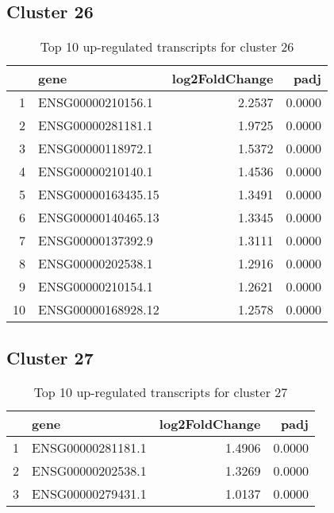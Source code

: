 \documentclass{article}
\begin{document}
\subsection{Cluster 26 }
\begin{table}[H]
\centering
\begin{tabular}{rlrr}
  \hline
 & gene & log2FoldChange & padj \\ 
  \hline
1 & ENSG00000210156.1 & 2.2537 & 0.0000 \\ 
  2 & ENSG00000281181.1 & 1.9725 & 0.0000 \\ 
  3 & ENSG00000118972.1 & 1.5372 & 0.0000 \\ 
  4 & ENSG00000210140.1 & 1.4536 & 0.0000 \\ 
  5 & ENSG00000163435.15 & 1.3491 & 0.0000 \\ 
  6 & ENSG00000140465.13 & 1.3345 & 0.0000 \\ 
  7 & ENSG00000137392.9 & 1.3111 & 0.0000 \\ 
  8 & ENSG00000202538.1 & 1.2916 & 0.0000 \\ 
  9 & ENSG00000210154.1 & 1.2621 & 0.0000 \\ 
  10 & ENSG00000168928.12 & 1.2578 & 0.0000 \\ 
   \hline
\end{tabular}
\caption{Top 10 up-regulated transcripts for cluster 26} 
\label{tab:q3_1_26}
\end{table}
\subsection{Cluster 27 }
\begin{table}[H]
\centering
\begin{tabular}{rlrr}
  \hline
 & gene & log2FoldChange & padj \\ 
  \hline
1 & ENSG00000281181.1 & 1.4906 & 0.0000 \\ 
  2 & ENSG00000202538.1 & 1.3269 & 0.0000 \\ 
  3 & ENSG00000279431.1 & 1.0137 & 0.0000 \\ 
   \hline
\end{tabular}
\caption{Top 10 up-regulated transcripts for cluster 27} 
\label{tab:q3_1_27}
\end{table}
\end{document}
